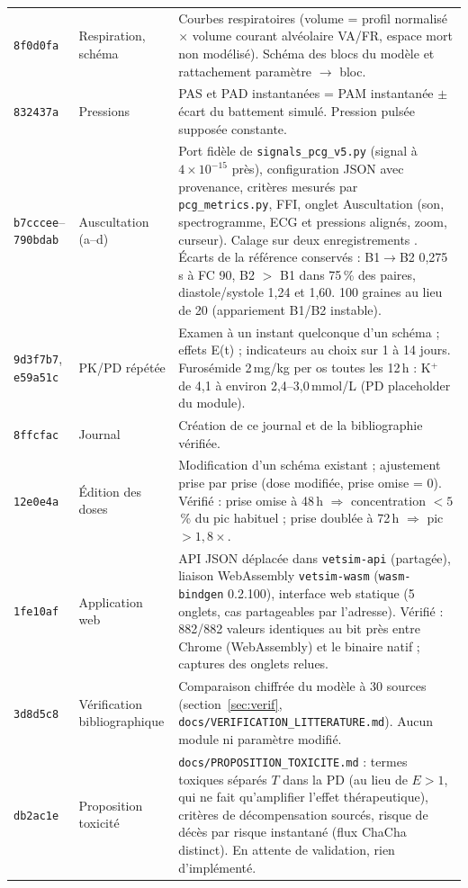 \documentclass[11pt,a4paper]{article}
\newcommand{\commit}[1]{\texttt{\small #1}}
\newcommand{\ecart}[1]{\textcolor{red!60!black}{#1}}
\begin{document}
\begin{longtable}{@{}p{1.5cm}p{4.2cm}p{10.3cm}@{}}
\commit{8f0d0fa} & Respiration, schéma & Courbes respiratoires (volume = profil normalisé $\times$ volume courant alvéolaire VA/FR, \ecart{espace mort non modélisé}). Schéma des blocs du modèle et rattachement paramètre $\to$ bloc.\\
\commit{832437a} & Pressions & PAS et PAD instantanées = PAM instantanée $\pm$ écart du battement simulé. \ecart{Pression pulsée supposée constante.}\\
\commit{b7cccee}--\commit{790bdab} & Auscultation (a--d) & Port fidèle de \texttt{signals\_pcg\_v5.py} (signal à $4\times10^{-15}$ près), configuration JSON avec provenance, critères mesurés par \texttt{pcg\_metrics.py}, FFI, onglet Auscultation (son, spectrogramme, ECG et pressions alignés, zoom, curseur). Calage sur deux enregistrements \citep{tiho}. \ecart{Écarts de la référence conservés : B1$\to$B2 0,275\,s à FC 90, B2 $>$ B1 dans 75\,\% des paires, diastole/systole 1,24 et 1,60.} 100 graines au lieu de 20 (appariement B1/B2 instable).\\
\commit{9d3f7b7}, \commit{e59a51c} & PK/PD répétée & Examen à un instant quelconque d'un schéma ; effets E(t) ; indicateurs au choix sur 1 à 14 jours. \ecart{Furosémide 2\,mg/kg per os toutes les 12\,h : K$^+$ de 4,1 à environ 2,4--3,0\,mmol/L (PD placeholder du module).}\\
\commit{8ffcfac} & Journal & Création de ce journal et de la bibliographie vérifiée.\\
\commit{12e0e4a} & Édition des doses & Modification d'un schéma existant ; ajustement prise par prise (dose modifiée, prise omise = 0). Vérifié : prise omise à 48\,h $\Rightarrow$ concentration $<5$\,\% du pic habituel ; prise doublée à 72\,h $\Rightarrow$ pic $>1{,}8\times$.\\
\commit{1fe10af} & Application web & API JSON déplacée dans \texttt{vetsim-api} (partagée), liaison WebAssembly \texttt{vetsim-wasm} (\texttt{wasm-bindgen} 0.2.100), interface web statique (5 onglets, cas partageables par l'adresse). Vérifié : 882/882 valeurs identiques au bit près entre Chrome (WebAssembly) et le binaire natif ; captures des onglets relues.\\
\commit{3d8d5c8} & Vérification bibliographique & Comparaison chiffrée du modèle à 30 sources (section~\ref{sec:verif}, \texttt{docs/VERIFICATION\_LITTERATURE.md}). Aucun module ni paramètre modifié.\\
\commit{db2ac1e} & Proposition toxicité & \texttt{docs/PROPOSITION\_TOXICITE.md} : termes toxiques séparés $T$ dans la PD (au lieu de $E>1$, qui ne fait qu'amplifier l'effet thérapeutique), critères de décompensation sourcés, risque de décès par risque instantané (flux ChaCha distinct). En attente de validation, rien d'implémenté.\\

\end{longtable}
\end{document}
